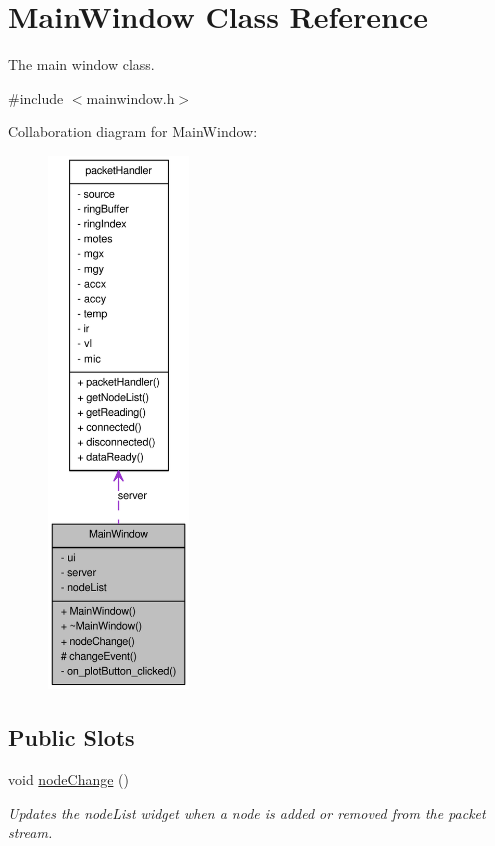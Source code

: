 \hypertarget{classMainWindow}{
\section{MainWindow Class Reference}
\label{classMainWindow}
}


The main window class.  




{\ttfamily \#include $<$mainwindow.h$>$}



Collaboration diagram for MainWindow:\nopagebreak
\begin{figure}[H]
\begin{center}
\leavevmode
\includegraphics[height=400pt]{classMainWindow__coll__graph}
\end{center}
\end{figure}
\subsection*{Public Slots}
\begin{DoxyCompactItemize}
\item 
\hypertarget{classMainWindow_a5d0ce13b14ee5fe76a4f7ed7f1de81c5}{
void \hyperlink{classMainWindow_a5d0ce13b14ee5fe76a4f7ed7f1de81c5}{nodeChange} ()}
\label{classMainWindow_a5d0ce13b14ee5fe76a4f7ed7f1de81c5}

\begin{DoxyCompactList}\small\item\em Updates the nodeList widget when a node is added or removed from the packet stream. \item\end{DoxyCompactList}\end{DoxyCompactItemize}
